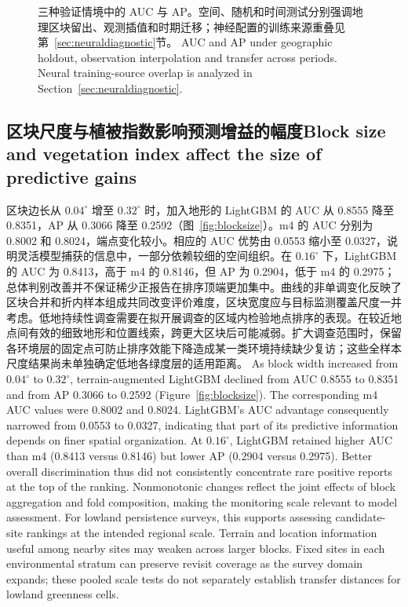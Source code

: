 \fi
\begin{figure}[htbp]\centering{}
\caption{\ifzh
三种验证情境中的 AUC 与 AP。空间、随机和时间测试分别强调地理区块留出、观测插值和时期迁移；神经配置的训练来源重叠见第~\ref{sec:neuraldiagnostic}节。
\else
AUC and AP under geographic holdout, observation interpolation and transfer across periods. Neural training-source overlap is analyzed in Section~\ref{sec:neuraldiagnostic}.
\fi}\label{fig:proto}
\end{figure}
\FloatBarrier
\subsection{\ifzh 区块尺度与植被指数影响预测增益的幅度\else Block size and vegetation index affect the size of predictive gains\fi}
\ifzh
区块边长从 $0.04^\circ$ 增至 $0.32^\circ$ 时，加入地形的 LightGBM 的 AUC 从 0.8555 降至 0.8351，AP 从 0.3066 降至 0.2592（图~\ref{fig:blocksize}）。m4 的 AUC 分别为 0.8002 和 0.8024，端点变化较小。相应的 AUC 优势由 0.0553 缩小至 0.0327，说明灵活模型捕获的信息中，一部分依赖较细的空间组织。在 $0.16^\circ$ 下，LightGBM 的 AUC 为 0.8413，高于 m4 的 0.8146，但 AP 为 0.2904，低于 m4 的 0.2975；总体判别改善并不保证稀少正报告在排序顶端更加集中。曲线的非单调变化反映了区块合并和折内样本组成共同改变评价难度，区块宽度应与目标监测覆盖尺度一并考虑。低地持续性调查需要在拟开展调查的区域内检验地点排序的表现。在较近地点间有效的细致地形和位置线索，跨更大区块后可能减弱。扩大调查范围时，保留各环境层的固定点可防止排序效能下降造成某一类环境持续缺少复访；这些全样本尺度结果尚未单独确定低地各绿度层的适用距离。
\else
As block width increased from $0.04^\circ$ to $0.32^\circ$, terrain-augmented LightGBM declined from AUC 0.8555 to 0.8351 and from AP 0.3066 to 0.2592 (Figure~\ref{fig:blocksize}). The corresponding m4 AUC values were 0.8002 and 0.8024. LightGBM's AUC advantage consequently narrowed from 0.0553 to 0.0327, indicating that part of its predictive information depends on finer spatial organization. At $0.16^\circ$, LightGBM retained higher AUC than m4 (0.8413 versus 0.8146) but lower AP (0.2904 versus 0.2975). Better overall discrimination thus did not consistently concentrate rare positive reports at the top of the ranking. Nonmonotonic changes reflect the joint effects of block aggregation and fold composition, making the monitoring scale relevant to model assessment. For lowland persistence surveys, this supports assessing candidate-site rankings at the intended regional scale. Terrain and location information useful among nearby sites may weaken across larger blocks. Fixed sites in each environmental stratum can preserve revisit coverage as the survey domain expands; these pooled scale tests do not separately establish transfer distances for lowland greenness cells.
